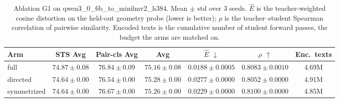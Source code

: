 \begin{table}[t]
\centering
\caption{Ablation G1 on qwen3\_0\_6b\_to\_minilmv2\_h384. Mean $\pm$ std over 3 seeds. $\hat{E}$ is the teacher-weighted cosine distortion on the held-out geometry probe (lower is better); $\rho$ is the teacher--student Spearman correlation of pairwise similarity. Encoded texts is the cumulative number of student forward passes, the budget the arms are matched on.}
\label{tab:ablation_g1_qwen3_0_6b_to_minilmv2_h384}
\begin{tabular}{lcccccc}
\toprule
Arm & STS Avg & Pair-cls Avg & Avg & $\hat{E}$ $\downarrow$ & $\rho$ $\uparrow$ & Enc.\ texts \\
\midrule
full & $74.87 \pm 0.08$ & $76.84 \pm 0.09$ & $75.16 \pm 0.08$ & $0.0188 \pm 0.0005$ & $0.8083 \pm 0.0010$ & 4.69M \\
directed & $74.64 \pm 0.00$ & $76.54 \pm 0.00$ & $75.28 \pm 0.00$ & $0.0277 \pm 0.0000$ & $0.8052 \pm 0.0000$ & 4.91M \\
symmetrized & $74.64 \pm 0.00$ & $76.67 \pm 0.00$ & $75.26 \pm 0.00$ & $0.0229 \pm 0.0000$ & $0.8100 \pm 0.0000$ & 4.85M \\
\bottomrule
\end{tabular}
\end{table}
